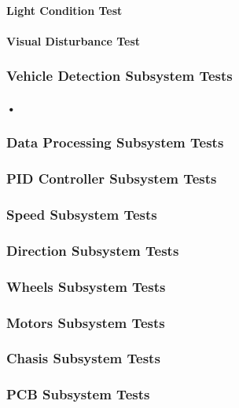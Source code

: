 \documentclass[a4paper,12pt]{article}
\begin{document}
		\paragraph{Light Condition Test}
		
		\paragraph{Visual Disturbance Test}
		
		\paragraph{}
	 
	 
	\subsubsection{Vehicle Detection Subsystem Tests}
	
		\paragraph{•}
	
	
	\subsubsection{Data Processing Subsystem Tests}	
		
	\subsubsection{PID Controller Subsystem Tests}
	
	
	
	
	\subsubsection{Speed Subsystem Tests}	
		
	\subsubsection{Direction Subsystem Tests}


	
	
	\subsubsection{Wheels Subsystem Tests}	
		
	\subsubsection{Motors Subsystem Tests}
	
	
	
	
	\subsubsection{Chasis Subsystem Tests}	
		
	\subsubsection{PCB Subsystem Tests}
	
\newpage
\end{document}
